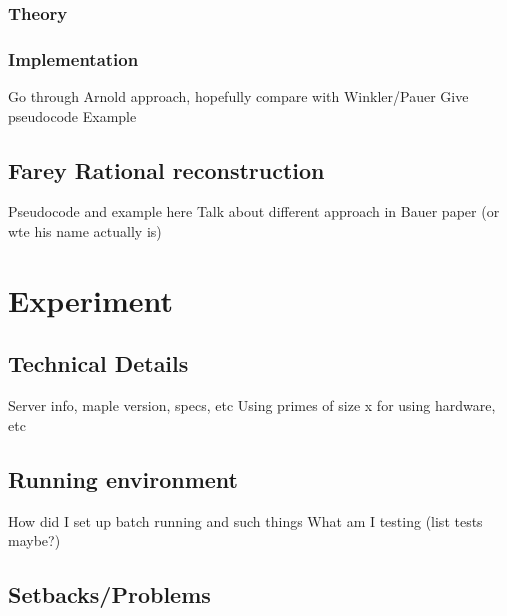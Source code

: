 \documentclass{article}
\begin{document}
\subsubsection{Theory}
\subsubsection{Implementation}
Go through Arnold approach, hopefully compare with Winkler/Pauer
Give pseudocode
Example
\subsection{Farey Rational reconstruction}
Pseudocode and example here
Talk about different approach in Bauer paper (or wte his name actually is)

\section{Experiment}
\subsection{Technical Details}
Server info, maple version, specs, etc
Using primes of size x for using hardware, etc
\subsection{Running environment}
How did I set up batch running and such things
What am I testing (list tests maybe?)
\subsection{Setbacks/Problems}

\noindent 
\end{document}
